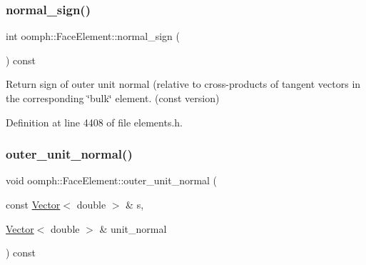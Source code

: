 \mbox{\label{classoomph_1_1FaceElement_a7a3b1effe068221ac39c14a9ed71d34d}} 
\subsubsection{\texorpdfstring{normal\+\_\+sign()}{normal\_sign()}\hspace{0.1cm}{\footnotesize\ttfamily [2/2]}}
{\footnotesize\ttfamily int oomph\+::\+Face\+Element\+::normal\+\_\+sign (\begin{DoxyParamCaption}{ }\end{DoxyParamCaption}) const\hspace{0.3cm}{\ttfamily [inline]}}



Return sign of outer unit normal (relative to cross-\/products of tangent vectors in the corresponding \char`\"{}bulk\char`\"{} element. (const version) 



Definition at line 4408 of file elements.\+h.

\mbox{\label{classoomph_1_1FaceElement_a49cf44d89e80926635d2a26abfbbf3b0}} 
\subsubsection{\texorpdfstring{outer\+\_\+unit\+\_\+normal()}{outer\_unit\_normal()}\hspace{0.1cm}{\footnotesize\ttfamily [1/2]}}
{\footnotesize\ttfamily void oomph\+::\+Face\+Element\+::outer\+\_\+unit\+\_\+normal (\begin{DoxyParamCaption}\item[{const \hyperlink{classoomph_1_1Vector}{Vector}$<$ double $>$ \&}]{s,  }\item[{\hyperlink{classoomph_1_1Vector}{Vector}$<$ double $>$ \&}]{unit\+\_\+normal }\end{DoxyParamCaption}) const}




